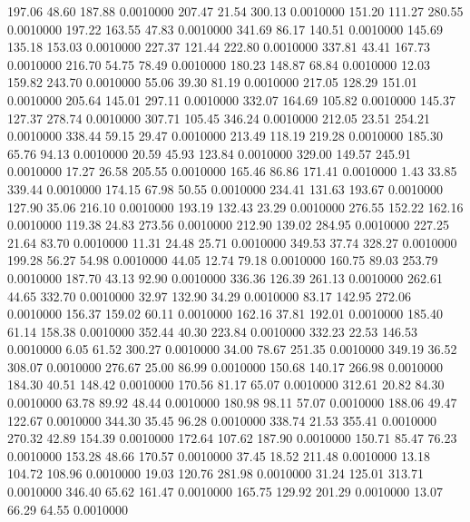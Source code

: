  197.06   48.60  187.88   0.0010000
 207.47   21.54  300.13   0.0010000
 151.20  111.27  280.55   0.0010000
 197.22  163.55   47.83   0.0010000
 341.69   86.17  140.51   0.0010000
 145.69  135.18  153.03   0.0010000
 227.37  121.44  222.80   0.0010000
 337.81   43.41  167.73   0.0010000
 216.70   54.75   78.49   0.0010000
 180.23  148.87   68.84   0.0010000
  12.03  159.82  243.70   0.0010000
  55.06   39.30   81.19   0.0010000
 217.05  128.29  151.01   0.0010000
 205.64  145.01  297.11   0.0010000
 332.07  164.69  105.82   0.0010000
 145.37  127.37  278.74   0.0010000
 307.71  105.45  346.24   0.0010000
 212.05   23.51  254.21   0.0010000
 338.44   59.15   29.47   0.0010000
 213.49  118.19  219.28   0.0010000
 185.30   65.76   94.13   0.0010000
  20.59   45.93  123.84   0.0010000
 329.00  149.57  245.91   0.0010000
  17.27   26.58  205.55   0.0010000
 165.46   86.86  171.41   0.0010000
   1.43   33.85  339.44   0.0010000
 174.15   67.98   50.55   0.0010000
 234.41  131.63  193.67   0.0010000
 127.90   35.06  216.10   0.0010000
 193.19  132.43   23.29   0.0010000
 276.55  152.22  162.16   0.0010000
 119.38   24.83  273.56   0.0010000
 212.90  139.02  284.95   0.0010000
 227.25   21.64   83.70   0.0010000
  11.31   24.48   25.71   0.0010000
 349.53   37.74  328.27   0.0010000
 199.28   56.27   54.98   0.0010000
  44.05   12.74   79.18   0.0010000
 160.75   89.03  253.79   0.0010000
 187.70   43.13   92.90   0.0010000
 336.36  126.39  261.13   0.0010000
 262.61   44.65  332.70   0.0010000
  32.97  132.90   34.29   0.0010000
  83.17  142.95  272.06   0.0010000
 156.37  159.02   60.11   0.0010000
 162.16   37.81  192.01   0.0010000
 185.40   61.14  158.38   0.0010000
 352.44   40.30  223.84   0.0010000
 332.23   22.53  146.53   0.0010000
   6.05   61.52  300.27   0.0010000
  34.00   78.67  251.35   0.0010000
 349.19   36.52  308.07   0.0010000
 276.67   25.00   86.99   0.0010000
 150.68  140.17  266.98   0.0010000
 184.30   40.51  148.42   0.0010000
 170.56   81.17   65.07   0.0010000
 312.61   20.82   84.30   0.0010000
  63.78   89.92   48.44   0.0010000
 180.98   98.11   57.07   0.0010000
 188.06   49.47  122.67   0.0010000
 344.30   35.45   96.28   0.0010000
 338.74   21.53  355.41   0.0010000
 270.32   42.89  154.39   0.0010000
 172.64  107.62  187.90   0.0010000
 150.71   85.47   76.23   0.0010000
 153.28   48.66  170.57   0.0010000
  37.45   18.52  211.48   0.0010000
  13.18  104.72  108.96   0.0010000
  19.03  120.76  281.98   0.0010000
  31.24  125.01  313.71   0.0010000
 346.40   65.62  161.47   0.0010000
 165.75  129.92  201.29   0.0010000
  13.07   66.29   64.55   0.0010000
